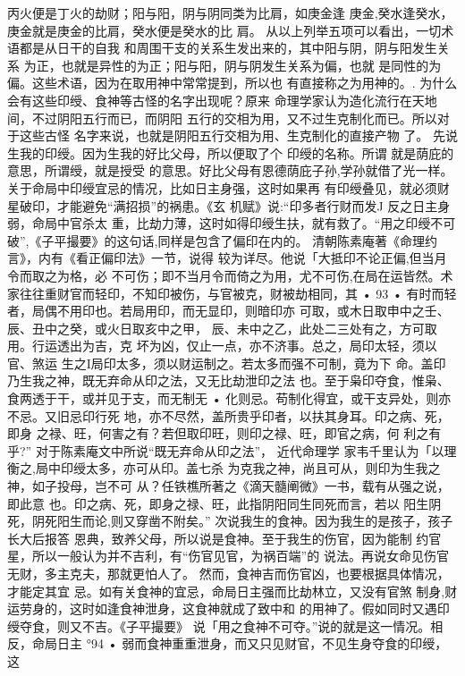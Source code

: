 丙火便是丁火的劫财；阳与阳，阴与阴同类为比肩，如庚金逢
庚金,癸水逢癸水，庚金就是庚金的比肩，癸水便是癸水的比
肩。
从以上列举五项可以看出，一切术语都是从日干的自我
和周围干支的关系生发出来的，其中阳与阴，阴与阳发生关系
为正，也就是异性的为正；阳与阳，阴与阴发生关系为偏，也就
是同性的为偏。这些术语，因为在取用神中常常提到，所以也
有直接称之为用神的。.
为什么会有这些印绶、食神等古怪的名字出现呢？原来
命理学家认为造化流行在天地间，不过阴阳五行而已，而阴阳
五行的交相为用，又不过生克制化而已。所以对于这些古怪
名字来说，也就是阴阳五行交相为用、生克制化的直接产物
了。
先说生我的印绶。因为生我的好比父母，所以便取了个
印绶的名称。所谓 就是荫庇的意思，所谓绶，就是授受
的意思。好比父母有恩德荫庇子孙,学孙就借了光一样。
关于命局中印绶宜忌的情况，比如日主身强，这时如果再
有印绶叠见，就必须财星破印，才能避免“满招损”的祸患。《玄
机赋》说:“印多者行财而发J 反之日主身弱，命局中官杀太
重，比劫力薄，这时如得印绶生扶，就有救了。“用之印绶不可
破”,《子平撮要》的这句话,同样是包含了偏印在内的。
清朝陈素庵著《命理约言》，内有《看正偏印法》一节，说得
较为详尽。他说「大抵印不论正偏,但当月令而取之为格，必
不可伤；即不当月令而倚之为用，尤不可伤,在局在运皆然。术
家往往重财官而轻印，不知印被伤，与官被克，财被劫相同，其
• 93 •
有时而轻者，局偶不用印也。若局用印，而无显印，则暗印亦
可取，或木日取申中之壬、辰、丑中之癸，或火日取亥中之甲，
辰、未中之乙，此处二三处有之，方可取用。行运透出为吉，克
坏为凶，仅止一点，亦不济事。总之，局印太轻，须以官、煞运
生之I局印太多，须以财运制之。若太多而强不可制，竟为下
命。盖印乃生我之神，既无弃命从印之法，又无比劫泄印之法
也。至于枭印夺食，惟枭、食两透于干，或并见于支，而无制无
• 化则忌。苟制化得宜，或干支异处，则亦不忌。又旧忌印行死
地，亦不尽然，盖所贵乎印者，以扶其身耳。印之病、死，即身
之禄、旺，何害之有？若但取印旺，则印之禄、旺，即官之病，何
利之有乎?”
对于陈素庵文中所说“既无弃命从印之法”， 近代命理学
家韦千里认为「以理衡之,局中印绶太多，亦可从印。盖七杀
为克我之神，尚且可从，则印为生我之神，如子投母，岂不可
从？任铁樵所著之《滴天髓阐微》一书，载有从强之说，即此意
也。印之病、死，即身之禄、旺，此指阴阳同生同死而言，若以
阳生阴死，阴死阳生而论,则又穿凿不附矣。”
次说我生的食神。因为我生的是孩子，孩子长大后报答
恩典，致养父母，所以说是食神。至于我生的伤官，因为能制
约官星，所以一般认为并不吉利，有“伤官见官，为祸百端”的
说法。再说女命见伤官无财，多主克夫，那就更怕人了。
然而，食神吉而伤官凶，也要根据具体情况，才能定其宜
忌。如有关食神的宜忌，命局日主强而比劫林立，又没有官煞
制身,财运劳身的，这时如逢食神泄身，这食神就成了致中和
的用神了。假如同时又遇印绶夺食，则又不吉。《子平撮要》
说「用之食神不可夺。”说的就是这一情况。相反，命局日主
°94 •
弱而食神重重泄身，而又只见财官，不见生身夺食的印绶，这
